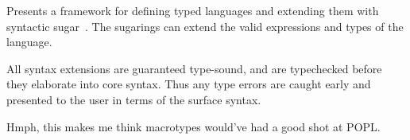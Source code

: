 \documentclass{article}
\begin{document}

Presents a framework for defining typed languages and extending them with syntactic sugar~\cite{le-sound}.
The sugarings can extend the valid expressions and types of the language.

All syntax extensions are guaranteed type-sound, and are typechecked before they elaborate into core syntax.
Thus any type errors are caught early and presented to the user in terms of the surface syntax.


Hmph, this makes me think macrotypes would've had a good shot at POPL.

\footnotesize


\end{document}

